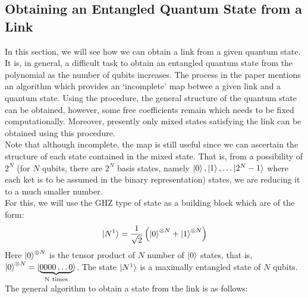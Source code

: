 \documentclass{scrartcl}
\begin{document}
\subsection{Obtaining an Entangled Quantum State from a Link}\label{state_from_link}
In this section, we will see how we can obtain a link from a given quantum state. It is, in general, a difficult task to obtain an entangled quantum state from the polynomial as the number of qubits increases. The process in the paper mentions an algorithm which provides an `incomplete' map betwee a given link and a quantum state. Using the procedure, the general structure of the quantum state can be obtained, however, some free coefficients remain which needs to be fixed computationally. Moreover, presently only mixed states satisfying the link can be obtained using this procedure. \\[0.3cm]
Note that although incomplete, the map is still useful since we can ascertain the structure of each state contained in the mixed state. That is, from a possibility of $2^N$ (for $N$ qubits, there are $2^N$ basis states, namely $\ket{0}, \ket{1}, \ldots \ket{2^N-1}$ where each ket is to be assumed in the binary representation) states, we are reducing it to a much smaller number. \\[0.3cm]
For this, we will use the GHZ type of state as a building block which are of the form:
\begin{align*}
    \ket{N^1} = \frac{1}{\sqrt{2}}\left( \ket{0}^{\otimes N} + \ket{1}^{\otimes N} \right) \\
\end{align*}
Here $\ket{0}^{\otimes N}$ is the tensor product of $N$ number of $\ket{0}$ states, that is, $\ket{0}^{\otimes N} = \ket{\underbrace{0000\ldots0}_{\mathrm{N\ times}}}$. The state $\ket{N^1}$ is a maximally entangled state of $N$ qubits. The general algorithm to obtain a state from the link is as follows:
\end{document}
